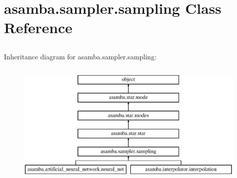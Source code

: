 \hypertarget{classasamba_1_1sampler_1_1sampling}{}\section{asamba.\+sampler.\+sampling Class Reference}
\label{classasamba_1_1sampler_1_1sampling}


\paragraph*{}

\subsection*{}

\subsection*{}

\subsection*{}

\subsection*{}

\subsection*{}

\subparagraph*{} 


Inheritance diagram for asamba.\+sampler.\+sampling\+:\begin{figure}[H]
\begin{center}
\leavevmode
\includegraphics[height=6.000000cm]{classasamba_1_1sampler_1_1sampling}
\end{center}
\end{figure}
